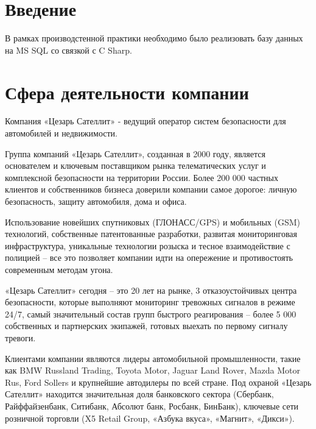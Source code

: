 \newpage

\section{Введение}

\vspace{0.5cm}
\hspace{0.6cm}
В рамках производстенной практики необходимо было реализовать базу данных на MS SQL со связкой с C Sharp. 

\section{Сфера деятельности компании}

\vspace{0.5cm}
\hspace{0.6cm}
Компания «Цезарь Сателлит» - ведущий оператор систем безопасности для автомобилей и недвижимости.

\vspace{0.1cm}
Группа компаний «Цезарь Сателлит», созданная в 2000 году, является основателем и ключевым поставщиком рынка телематических услуг и комплексной безопасности на территории России. Более 200 000 частных клиентов и собственников бизнеса доверили компании самое дорогое: личную безопасность, защиту автомобиля, дома и офиса.

\vspace{0.1cm}
Использование новейших спутниковых (ГЛОНАСС/GPS) и мобильных (GSM) технологий, собственные патентованные разработки, развитая мониторинговая инфраструктура, уникальные технологии розыска и тесное взаимодействие с полицией – все это позволяет компании идти на опережение и противостоять современным методам угона.

\vspace{0.1cm}
«Цезарь Сателлит» сегодня – это 20 лет на рынке, 3 отказоустойчивых центра безопасности, которые выполняют мониторинг тревожных сигналов в режиме 24/7, самый значительный состав групп быстрого реагирования – более 5 000 собственных и партнерских экипажей, готовых выехать по первому сигналу тревоги.

\vspace{0.1cm}
Клиентами компании являются лидеры автомобильной промышленности, такие как BMW Russland Trading, Toyota Motor, Jaguar Land Rover, Mazda Motor Rus, Ford Sollers и крупнейшие автодилеры по всей стране. Под охраной «Цезарь Сателлит» находится значительная доля банковского сектора (Сбербанк, Райффайзенбанк, Ситибанк, Абсолют банк, Росбанк, БинБанк), ключевые сети розничной торговли (X5 Retail Group, «Азбука вкуса», «Магнит», «Дикси»).

